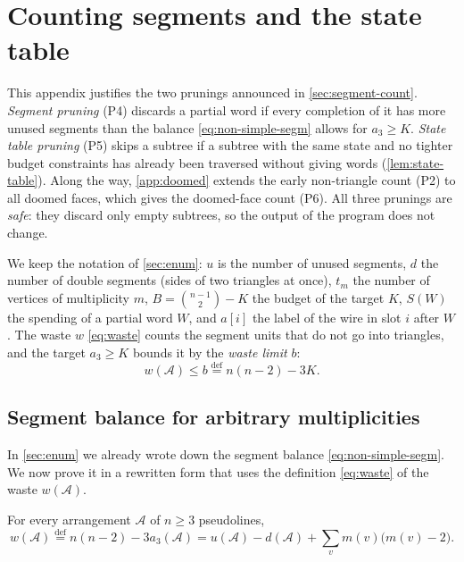 \section{Counting segments and the state table}\label{app:prunings}

This appendix justifies the two prunings announced in \cref{sec:segment-count}.
\emph{Segment pruning} (P4) discards a partial word if every completion of it has more unused segments than the balance \eqref{eq:non-simple-segm} allows for $a_3\ge K$.
\emph{State table pruning} (P5) skips a subtree if a subtree with the same state and no tighter budget constraints has already been traversed without giving words (\cref{lem:state-table}).
Along the way, \cref{app:doomed} extends the early non-triangle count (P2) to all doomed faces, which gives the doomed-face count (P6).
All three prunings are \emph{safe}: they discard only empty subtrees, so the output of the program does not change.

We keep the notation of \cref{sec:enum}: $u$ is the number of unused segments, $d$ the number of double segments (sides of two triangles at once), $t_m$ the number of vertices of multiplicity $m$, $B=\binom{n-1}2-K$ the budget of the target $K$, $S(W)$ the spending of a partial word $W$, and $a[i]$ the label of the wire in slot $i$ after $W$.
The waste $w$ \eqref{eq:waste} counts the segment units that do not go into triangles, and the target $a_3\ge K$ bounds it by the \emph{waste limit} $b$:
\begin{equation}\label{eq:waste-limit}
w(\mathcal A)\le b\overset{\mathrm{def}}{=}n(n-2)-3K .
\end{equation}

\subsection{Segment balance for arbitrary multiplicities}

In \cref{sec:enum} we already wrote down the segment balance \eqref{eq:non-simple-segm}. We now prove it in a rewritten form that uses the definition \eqref{eq:waste} of the waste $w(\mathcal{A})$.

\begin{lemma}\label{lem:segment-balance}
For every arrangement $\mathcal A$ of $n\ge3$ pseudolines,
\begin{equation}\label{eq:segm-balance}
w(\mathcal A)\overset{\mathrm{def}}{=}n(n-2)-3a_3(\mathcal A)
=u(\mathcal A)-d(\mathcal A)+\sum_v m(v)\bigl(m(v)-2\bigr).
\end{equation}
\end{lemma}

